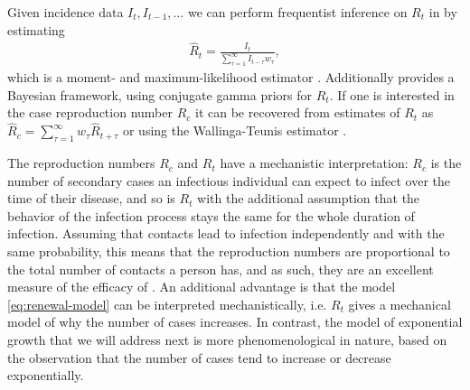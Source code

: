 Given incidence data $I_{t}, I_{t - 1}, \dots $ we can perform frequentist inference on $R_{t}$ in  by estimating
\begin{align}
    \label{eq:hatR}
    \hat R_{t} = \frac{I_{t}}{\sum_{\tau = 1}^{\infty} I_{t - \tau} w_{\tau}},
\end{align}
which is a moment- and maximum-likelihood estimator \citep{Hotz2020Monitoring}. Additionally \citep{Cori2021EpiEstim} provides a Bayesian framework, using conjugate gamma priors for $R_{t}$. If one is interested in the case reproduction number $R_{c}$ it can be recovered from estimates of $R_{t}$ as $\hat R_{c} = \sum_{\tau = 1}^\infty w_{\tau} \hat R_{t + \tau}$ or using the Wallinga-Teunis estimator \citep{Wallinga2004Different}.

The reproduction numbers $R_{c}$ and $R_{t}$ have a mechanistic interpretation: $R_{c}$ is the number of secondary cases an infectious individual can expect to infect over the time of their disease, and so is $R_{t}$ with the additional assumption that the behavior of the infection process stays the same for the whole duration of infection. 
Assuming that contacts lead to infection independently and with the same probability, this means that the reproduction numbers are proportional to the total number of contacts a person has, and as such, they are an excellent measure of the efficacy of  \citep{Brauner2021Inferring,Khazaei2023Using,Flaxman2020Estimating}. 
An additional advantage is that the model \eqref{eq:renewal-model} can be interpreted mechanistically, i.e. $R_{t}$ gives a mechanical model of why the number of cases increases. In contrast, the  model of exponential growth that we will address next is more phenomenological in nature, based on the observation that the number of cases tend to increase or decrease exponentially. 

